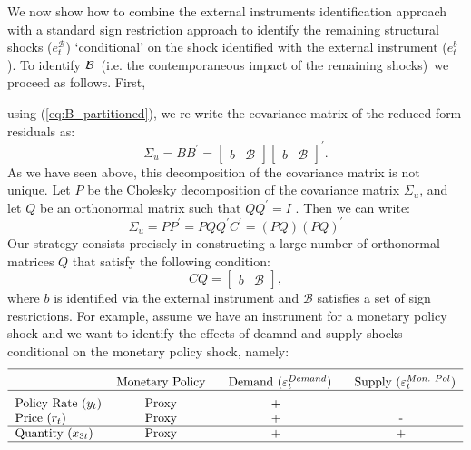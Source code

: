 \documentclass[10pt]{article}
\begin{document}
We now show how to combine the external instruments identification approach
with a standard sign restriction approach to identify the remaining
structural shocks ($e_{t}^{\mathcal{B}}$) `conditional' on the shock
identified with the external instrument ($e_{t}^{b}$). To identify $\mathcal{%
B}$\ (i.e. the contemporaneous impact of the remaining shocks)\ we proceed
as follows. First,

using (\ref{eq:B_partitioned}), we re-write the covariance matrix of the
reduced-form residuals as:%
\begin{equation}
\Sigma _{u}=BB^{\prime }=\left[
\begin{array}{cc}
b & \mathcal{B}%
\end{array}%
\right] \left[
\begin{array}{cc}
b & \mathcal{B}%
\end{array}%
\right] ^{\prime }.  \label{eq:cov_partitioned}
\end{equation}%
As we have seen above, this decomposition of the covariance matrix is not
unique. Let $P$ be the Cholesky decomposition of the covariance matrix $%
\Sigma _{u}$, and let $Q$ be an orthonormal matrix such that $QQ^{\prime }=I$%
. Then we can write:%
\begin{equation}
\Sigma _{u}=PP^{\prime }=PQQ^{\prime }C^{\prime }=\left( PQ\right) \left(
PQ\right) ^{\prime }
\end{equation}%
Our strategy consists precisely in constructing a large number of
orthonormal matrices $Q$ that satisfy the following condition:%
\begin{equation*}
CQ=\left[
\begin{array}{cc}
b & \mathcal{B}%
\end{array}%
\right] ,
\end{equation*}%
where $b$ is identified via the external instrument and $\mathcal{B}$
satisfies a set of sign restrictions. For example, assume we have an
instrument for a monetary policy shock and we want to identify the effects
of deamnd and supply shocks conditional on the monetary policy shock, namely:%
\begin{equation*}
\begin{tabular}{lccc}
\hline
\addlinespace & Monetary Policy & $\text{Demand}$ ($\varepsilon _{t}^{Demand}
$) & $\text{Supply}$ ($\varepsilon _{t}^{Mon.\ Pol}$) \\ \hline
\addlinespace Policy Rate ($y_{t}$) & Proxy & + &  \\
Price ($r_{t}$) & Proxy & + & - \\ \hline
Quantity ($x_{3t}$) & Proxy & + & + \\ \hline
\end{tabular}%
\end{equation*}
\end{document}
